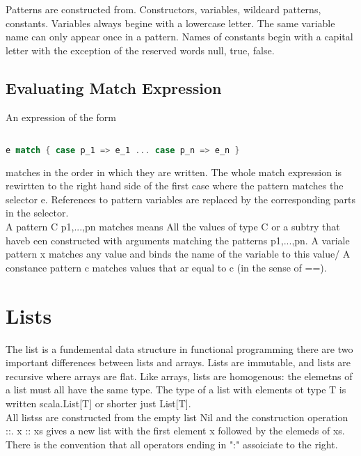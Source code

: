 \documentclass[10pt, a4paper]{report}
\begin{document}
Patterns are constructed from. Constructors, variables, wildcard patterns, constants. Variables always begine with a lowercase letter. The same variable name can only appear once in a pattern. Names of constants begin with a capital letter with the exception of the reserved words null, true, false.

\subsection{Evaluating Match Expression}

An expression of the form

\begin{lstlisting}[language=scala]

e match { case p_1 => e_1 ... case p_n => e_n } 

\end{lstlisting}

 matches in the order in which they are written. The whole match expression is rewirtten to the right hand side of the first case where the pattern matches the selector e. References to pattern variables are replaced by the corresponding parts in the selector.\\ A pattern C p1,...,pn matches means All the values of type C or a subtry that haveb een constructed with arguments matching the patterns p1,...,pn. A variale pattern x matches any value and binds the name of the variable to this value/ A constance pattern c matches values that ar equal to c (in the sense of ==). 
 
 
 


\section{Lists}

The list is a fundemental data structure in functional programming there are two important differences between lists and arrays. Lists are immutable, and lists are recursive where arrays are flat. Like arrays, lists are homogenous: the elemetns of a list must all have the same type. The type of a list with elements ot type T is written scala.List[T] or shorter just List[T].\\ All listss are constructed from the empty list Nil and the construction operation ::. x :: xs  gives a new list with the first element x followed by the elemeds of xs.\\ There is the convention that all operators ending in ":" assoiciate to the right.\\
\end{document}
